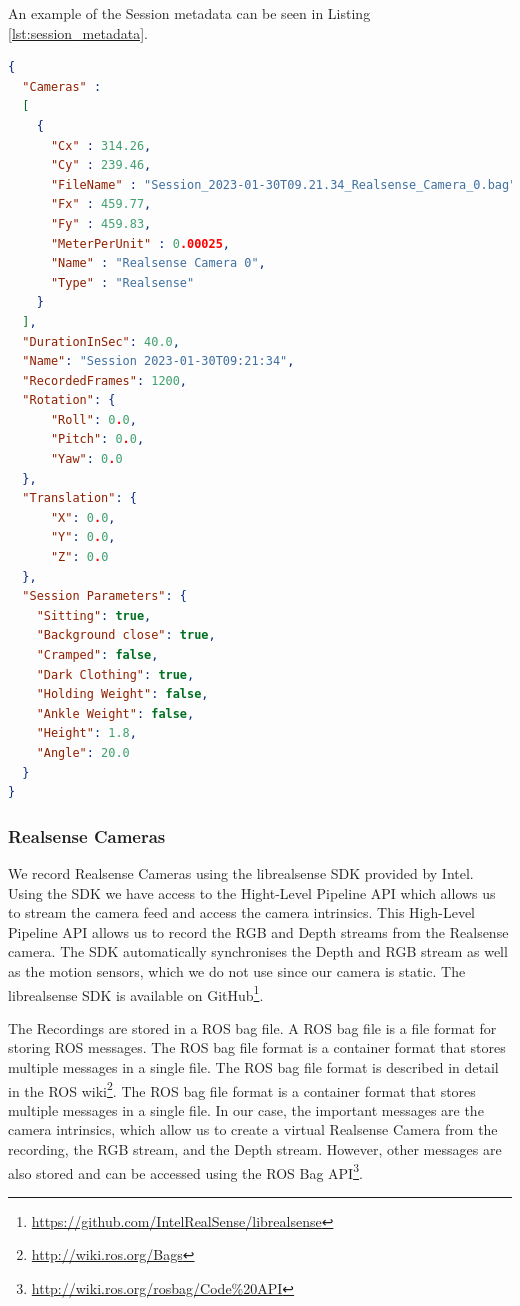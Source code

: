 An example of the Session metadata can be seen in Listing \ref{lst:session_metadata}.

\begin{lstlisting}[language=json,
                   firstnumber=1,
                   caption={[Example of session metadata]{Example of the Session metadata with a single Realsense Camera which was recorded for 40 seconds at around 30 frames per second resulting in 1200 frames. Some values have been changed to increase readability.}},
                   label={lst:session_metadata}]
{
  "Cameras" : 
  [
    {
      "Cx" : 314.26,
      "Cy" : 239.46,
      "FileName" : "Session_2023-01-30T09.21.34_Realsense_Camera_0.bag",
      "Fx" : 459.77,
      "Fy" : 459.83,
      "MeterPerUnit" : 0.00025,
      "Name" : "Realsense Camera 0",
      "Type" : "Realsense"
    }
  ],
  "DurationInSec": 40.0,
  "Name": "Session 2023-01-30T09:21:34",
  "RecordedFrames": 1200,
  "Rotation": {
      "Roll": 0.0,
      "Pitch": 0.0,
      "Yaw": 0.0
  },
  "Translation": {
      "X": 0.0,
      "Y": 0.0,
      "Z": 0.0
  },
  "Session Parameters": {
    "Sitting": true,
    "Background close": true,
    "Cramped": false,
    "Dark Clothing": true,
    "Holding Weight": false,
    "Ankle Weight": false,
    "Height": 1.8,
    "Angle": 20.0
  }
}
\end{lstlisting}

\subsubsection{Realsense Cameras}

We record Realsense Cameras using the librealsense SDK provided by Intel. Using the SDK we have access to the Hight-Level Pipeline API which allows us to stream the camera feed and access the camera intrinsics. This High-Level Pipeline API allows us to record the RGB and Depth streams from the Realsense camera. The SDK automatically synchronises the Depth and RGB stream as well as the motion sensors, which we do not use since our camera is static. The librealsense SDK is available on GitHub\footnote{\url{https://github.com/IntelRealSense/librealsense}}.

The Recordings are stored in a ROS bag file. A ROS bag file is a file format for storing ROS messages. The ROS bag file format is a container format that stores multiple messages in a single file. The ROS bag file format is described in detail in the ROS wiki\footnote{\url{http://wiki.ros.org/Bags}}. The ROS bag file format is a container format that stores multiple messages in a single file. In our case, the important messages are the camera intrinsics, which allow us to create a virtual Realsense Camera from the recording, the RGB stream, and the Depth stream. However, other messages are also stored and can be accessed using the ROS Bag API\footnote{\url{http://wiki.ros.org/rosbag/Code\%20API}}.

